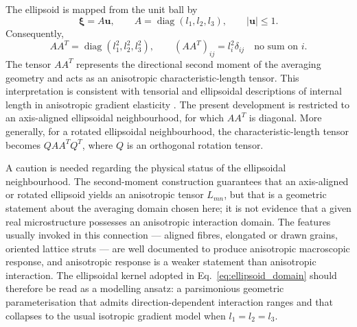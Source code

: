 \documentclass[final,3p,times,fleqn]{elsarticle}
\begin{document}
The ellipsoid is mapped from the unit ball by
\[
  \boldsymbol{\xi}=A\mathbf{u},
  \qquad
  A=\operatorname{diag}(l_1,l_2,l_3),
  \qquad
  |\mathbf{u}|\leq 1 .
\]
Consequently,
\begin{equation}\label{eq:AAT}
  AA^T
  =
  \operatorname{diag}(l_1^2,l_2^2,l_3^2),
  \qquad
  (AA^T)_{ij}=l_i^2\delta_{ij}
  \quad \text{no sum on } i .
\end{equation}
The tensor $AA^T$ represents the directional second moment of the
averaging geometry and acts as an anisotropic characteristic-length
tensor. This interpretation is consistent with tensorial and ellipsoidal
descriptions of internal length in anisotropic gradient elasticity
\cite{LazarPo2015,Polizzotto2018,Auffray2019}. The present development
is restricted to an axis-aligned ellipsoidal neighbourhood, for which
$AA^T$ is diagonal. More generally, for a rotated ellipsoidal
neighbourhood, the characteristic-length tensor becomes
$QAA^TQ^T$, where $Q$ is an orthogonal rotation tensor.

A caution is needed regarding the physical status of the
ellipsoidal neighbourhood. The second-moment construction guarantees
that an axis-aligned or rotated ellipsoid yields an anisotropic tensor
$L_{mn}$, but that is a geometric statement about the averaging domain
chosen here; it is not evidence that a given real microstructure
possesses an anisotropic interaction domain. The features usually
invoked in this connection --- aligned fibres, elongated or drawn
grains, oriented lattice struts --- are well documented to produce
anisotropic macroscopic response, and anisotropic response is a weaker
statement than anisotropic interaction. The ellipsoidal kernel adopted
in Eq.~\eqref{eq:ellipsoid_domain} should therefore be read as a
modelling ansatz: a parsimonious geometric parameterisation that admits
direction-dependent interaction ranges and that collapses to the usual
isotropic gradient model when $l_1=l_2=l_3$.
\end{document}
